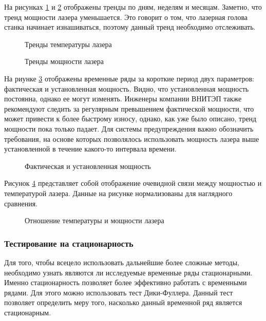 На рисунках \ref{tempdiv} и \ref{powerdiv} отображены
тренды по дням, неделям и месяцам.
Заметно, что тренд мощности лазера уменьшается.
Это говорит о том, что лазерная голова
станка начинает изнашиваться,
поэтому данный тренд необходимо отслеживать.

\begin{figure}[H]
    \caption{Тренды температуры лазера}
    \label{tempdiv}
\end{figure}

\begin{figure}[H]
    \caption{Тренды мощности лазера}
    \label{powerdiv}
\end{figure}


На риунке \ref{checkpower} отображены временные
ряды за короткие период двух параметров: фактическая и установленная мощность.
Видно, что установленная мощность постоянна, однако ее могут изменять.
Инженеры компании ВНИТЭП также рекомендуют следить
за регулярным превышением фактической мощности,
что может привести к более быстрому износу,
однако, как уже было описано,
тренд мощности пока только падает.
Для системы предупреждения важно обозначить требования,
на основе которых позволялось использовать мощность
лазера выше установленной в течение какого-то интервала времени.


\begin{figure}[H]
    \caption{Фактическая и установленная мощность}
    \label{checkpower}
\end{figure}


Рисунок \ref{powertemp} представляет собой отображение
очевидной связи между мощностью и температурой лазера.
Данные на рисунке нормализованы для наглядного сравнения.

\begin{figure}[H]
    \caption{Отношение температуры и мощности лазера}
    \label{powertemp}
\end{figure}


\subsubsection{Тестирование на стационарность}

Для того, чтобы всецело использовать дальнейшие более сложные методы,
необходимо узнать являются ли исследуемые
временные ряды стационарными.
Именно стационарность позволяет
более эффективно работать с временными рядами.
Для этого можно использовать тест Дики-Фуллера.
Данный тест позволяет определить меру того,
насколько данный временной ряд является стационарным.

